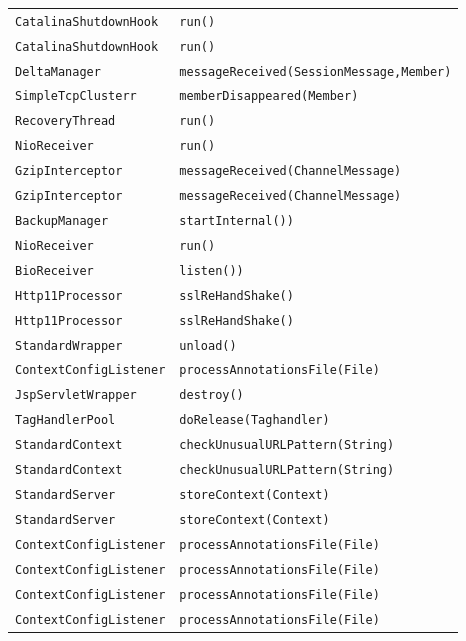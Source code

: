\begin{center}
\begin{longtable}{ll}
\lstinline/CatalinaShutdownHook/&{\lstinline/run()/}\\
\lstinline/CatalinaShutdownHook/&{\lstinline/run()/}\\
\lstinline/DeltaManager/&{\lstinline/messageReceived(SessionMessage,Member)/}\\
\lstinline/SimpleTcpClusterr/&{\lstinline/memberDisappeared(Member)/}\\
\lstinline/RecoveryThread/&{\lstinline/run()/}\\
\lstinline/NioReceiver/&{\lstinline/run()/}\\
\lstinline/GzipInterceptor/&{\lstinline/messageReceived(ChannelMessage)/}\\
\lstinline/GzipInterceptor/&{\lstinline/messageReceived(ChannelMessage)/}\\
\lstinline/BackupManager/&{\lstinline/startInternal())/}\\
\lstinline/NioReceiver/&{\lstinline/run()/}\\
\lstinline/BioReceiver/&{\lstinline/listen())/}\\
\lstinline/Http11Processor/&{\lstinline/sslReHandShake()/}\\
\lstinline/Http11Processor/&{\lstinline/sslReHandShake()/}\\
\lstinline/StandardWrapper/&{\lstinline/unload()/}\\
\lstinline/ContextConfigListener/&{\lstinline/processAnnotationsFile(File)/}\\
\lstinline/JspServletWrapper/&{\lstinline/destroy()/}\\
\lstinline/TagHandlerPool/&{\lstinline/doRelease(Taghandler)/}\\
\lstinline/StandardContext/&{\lstinline/checkUnusualURLPattern(String)/}\\
\lstinline/StandardContext/&{\lstinline/checkUnusualURLPattern(String)/}\\
\lstinline/StandardServer/&{\lstinline/storeContext(Context)/}\\
\lstinline/StandardServer/&{\lstinline/storeContext(Context)/}\\
\lstinline/ContextConfigListener/&{\lstinline/processAnnotationsFile(File)/}\\
\lstinline/ContextConfigListener/&{\lstinline/processAnnotationsFile(File)/}\\
\lstinline/ContextConfigListener/&{\lstinline/processAnnotationsFile(File)/}\\
\lstinline/ContextConfigListener/&{\lstinline/processAnnotationsFile(File)/}\\

\end{longtable}
\end{center}
